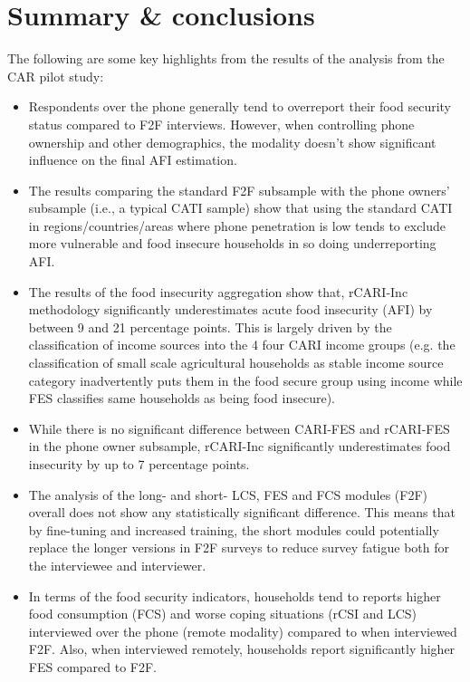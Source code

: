 \documentclass[11pt,harvard]{article}
\begin{document}
\pagebreak

	
\section{Summary \& conclusions}
		
The following are some key highlights from the results of the analysis from the CAR pilot study:

	\begin{itemize}[left=2.5em]
		\item Respondents over the phone generally tend to overreport their food security status compared to F2F interviews. However, when controlling phone ownership and other demographics, the modality doesn’t show significant influence on the final AFI estimation.
		\item 	The results comparing the standard F2F subsample with the phone owners’ subsample (i.e., a typical CATI sample) show that using the standard CATI in regions/countries/areas where phone penetration is low tends to exclude more vulnerable and food insecure households in so doing underreporting AFI.
		\item The results of the food insecurity aggregation show that, rCARI-Inc methodology significantly underestimates acute food insecurity (AFI) by between 9 and 21 percentage points. This is largely driven by the classification of income sources into the 4 four CARI income groups (e.g. the classification of small scale agricultural households as stable income source category inadvertently puts them in the food secure group  using income while FES classifies same households as being food insecure).
		\item While there is no significant difference between CARI-FES and rCARI-FES in the phone owner subsample, rCARI-Inc significantly underestimates food insecurity by up to 7 percentage points.
		\item The analysis of the long- and short- LCS, FES and FCS modules (F2F) overall does not show any statistically significant difference. This means that by fine-tuning and increased training, the short modules could potentially replace the longer versions in F2F surveys to reduce survey fatigue both for the interviewee and interviewer.
		\item In terms of the food security indicators,  households tend to  reports higher food consumption (FCS) and worse coping situations (rCSI and LCS)  interviewed over the phone (remote modality) compared to when interviewed F2F. Also, when interviewed remotely, households report significantly higher FES compared to F2F. 
	
	
	\end{itemize}
	
\end{document}
